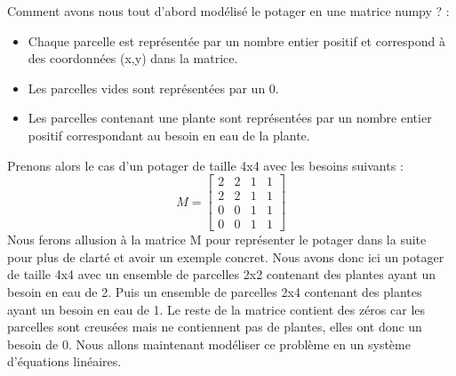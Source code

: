 \documentclass[french,a4paper]{article}
\begin{document}
\newline Comment avons nous tout d'abord modélisé le potager en une matrice numpy ? :
\begin{itemize}
    \item Chaque parcelle est représentée par un nombre entier positif et correspond à des coordonnées (x,y) dans la matrice.
    \item Les parcelles vides sont représentées par un 0.
    \item Les parcelles contenant une plante sont représentées par un nombre entier positif correspondant au besoin en eau de la plante.
\end{itemize}
Prenons alors le cas d'un potager de taille 4x4 avec les besoins suivants :
\newline
\[M = \begin{bmatrix} 2 & 2 & 1 & 1 \\ 2 & 2 & 1 & 1 \\ 0 & 0 & 1 & 1 \\ 0 & 0 & 1 & 1 \end{bmatrix}\]
\newline Nous ferons allusion à la matrice M pour représenter le potager dans la suite pour plus de clarté et avoir un exemple concret.
\newline Nous avons donc ici un potager de taille 4x4 avec un ensemble de parcelles 2x2 contenant des plantes ayant un besoin en eau de 2. Puis un ensemble de parcelles 2x4 contenant des plantes ayant un besoin en eau de 1. Le reste de la matrice contient des zéros car les parcelles sont creusées mais ne contiennent pas de plantes, elles ont donc un besoin de 0.
\newline Nous allons maintenant modéliser ce problème en un système d'équations linéaires.
\end{document}
